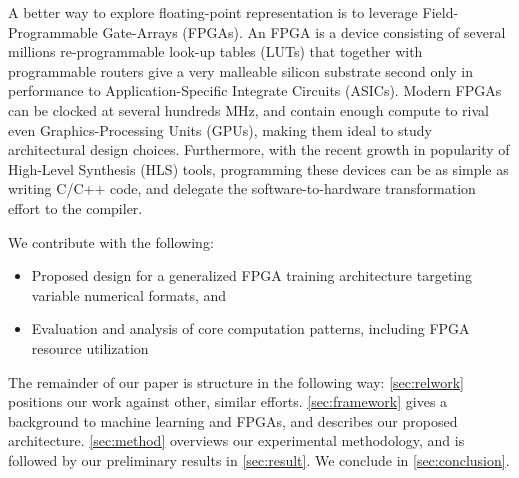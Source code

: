 \documentclass[techrep,english]{ipsj} %
\begin{document}
A better way to explore floating-point representation is to leverage Field-Programmable Gate-Arrays (FPGAs).
An FPGA is a device consisting of several millions re-programmable look-up tables (LUTs) that together with programmable routers give a very malleable silicon substrate second only in performance to Application-Specific Integrate Circuits (ASICs).
Modern FPGAs can be clocked at several hundreds MHz, and contain enough compute to rival even Graphics-Processing Units (GPUs), making them ideal to study architectural design choices.
Furthermore, with the recent growth in popularity of High-Level Synthesis (HLS) tools, programming these devices can be as simple as writing C/C++ code, and delegate the software-to-hardware transformation effort to the compiler.

We contribute with the following:
\begin{itemize}
\item Proposed design for a generalized FPGA training architecture targeting variable numerical formats, and
\item Evaluation and analysis of core computation patterns, including FPGA resource utilization
\end{itemize}

The remainder of our paper is structure in the following way: \cref{sec:relwork} positions our work against other, similar efforts.
\cref{sec:framework} gives a background to machine learning and FPGAs, and describes our proposed architecture.
\cref{sec:method} overviews our experimental methodology, and is followed by our preliminary results in \cref{sec:result}.
We conclude in \cref{sec:conclusion}.
\end{document}

